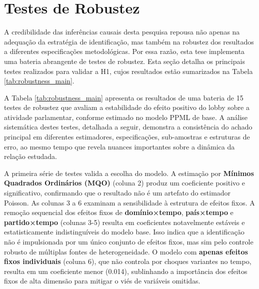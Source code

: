 \chapter{Testes de Robustez}
\label{appendix:robustness}

A credibilidade das inferências causais desta pesquisa repousa não apenas na adequação da estratégia de identificação, mas também na robustez dos resultados a diferentes especificações metodológicas. Por essa razão, esta tese implementa uma bateria abrangente de testes de robustez. Esta seção detalha os principais testes realizados para validar a H1, cujos resultados estão sumarizados na Tabela \ref{tab:robustness_main}.


A Tabela \ref{tab:robustness_main} apresenta os resultados de uma bateria de 15 testes de robustez que avaliam a estabilidade do efeito positivo do lobby sobre a atividade parlamentar, conforme estimado no modelo PPML de base. A análise sistemática destes testes, detalhada a seguir, demonstra a consistência do achado principal em diferentes estimadores, especificações, sub-amostras e estruturas de erro, ao mesmo tempo que revela nuances importantes sobre a dinâmica da relação estudada.

\begin{landscape}
    \centering
    \label{tab:robustness_main}
    
\end{landscape}

A primeira série de testes valida a escolha do modelo. A estimação por \textbf{Mínimos Quadrados Ordinários (MQO)} (coluna 2) produz um coeficiente positivo e significativo, confirmando que o resultado não é um artefato do estimador Poisson. As colunas 3 a 6 examinam a sensibilidade à estrutura de efeitos fixos. A remoção sequencial dos efeitos fixos de \textbf{domínio×tempo}, \textbf{país×tempo} e \textbf{partido×tempo} (colunas 3-5) resulta em coeficientes notavelmente estáveis e estatisticamente indistinguíveis do modelo base. Isso indica que a identificação não é impulsionada por um único conjunto de efeitos fixos, mas sim pelo controle robusto de múltiplas fontes de heterogeneidade. O modelo com \textbf{apenas efeitos fixos individuais} (coluna 6), que não controla por choques variantes no tempo, resulta em um coeficiente menor (0.014), sublinhando a importância dos efeitos fixos de alta dimensão para mitigar o viés de variáveis omitidas.

